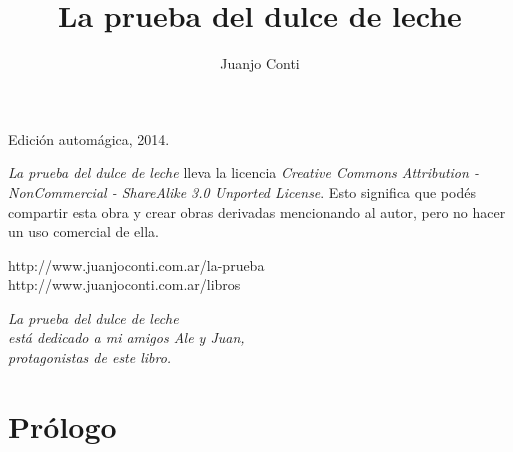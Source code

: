 \documentclass[12pt,twoside,openright,a5paper]{book}
\title{La prueba del dulce de leche}
\author{Juanjo Conti}
\date{}
\begin{document}
\pagestyle{plain}

\maketitle


\thispagestyle{empty}
\noindent
Edición automágica, 2014.\\

\vspace{0.5cm}

\noindent
\emph{La prueba del dulce de leche} lleva la licencia 
\emph{Creative Commons Attribution - NonCommercial - ShareAlike 3.0 Unported License}.
Esto significa que podés compartir esta obra y crear obras derivadas
mencionando al autor, pero no ha\-cer un uso comercial de ella.

\vfill

\noindent
http://www.juanjoconti.com.ar/la-prueba\\

\noindent
http://www.juanjoconti.com.ar/libros

\cleardoublepage

\noindent
\begin{flushright}
\emph{
\emph{La prueba del dulce de leche}\\
está dedicado a mi amigos Ale y Juan,\\
protagonistas de este libro.
}
\end{flushright}

\cleardoublepage

\renewcommand*\contentsname{Índice}

\tableofcontents

\chapter*{Prólogo}
\end{document}
